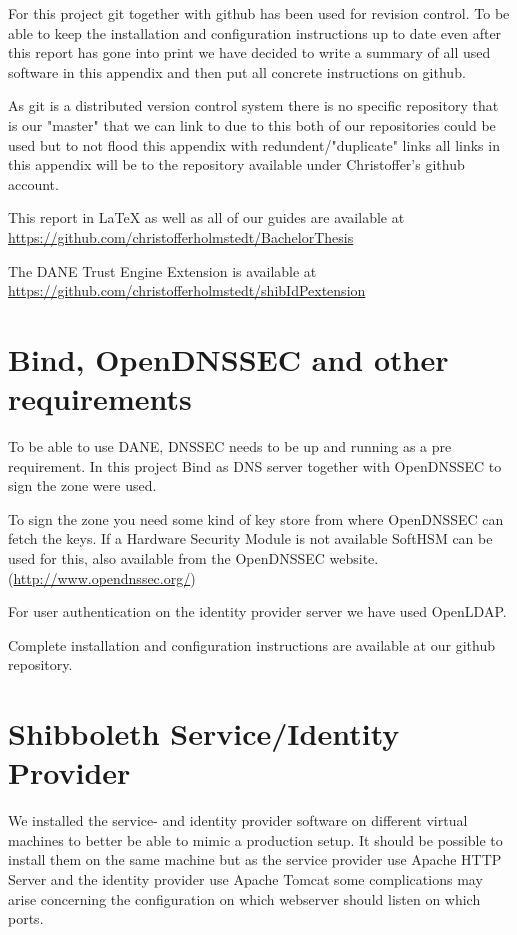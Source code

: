 For this project git together with github has been used for revision control.
To be able to keep the installation and configuration instructions up to date even after this report has gone into print we have decided to write a summary of all used software in this appendix and then put all concrete instructions on github.

As git is a distributed version control system there is no specific repository that is our "master" that we can link to due to this both of our repositories could be used but to not flood this appendix with redundent/"duplicate" links all links in this appendix will be to the repository available under Christoffer's github account.

This report in LaTeX as well as all of our guides are available at \\
\url{https://github.com/christofferholmstedt/BachelorThesis}

The DANE Trust Engine Extension is available at \\
\url{https://github.com/christofferholmstedt/shibIdPextension}

\section{Bind, OpenDNSSEC and other requirements}
To be able to use DANE, DNSSEC needs to be up and running as a pre requirement.
In this project Bind as DNS server together with OpenDNSSEC to sign the zone were used.

To sign the zone you need some kind of key store from where OpenDNSSEC can fetch the keys.
If a Hardware Security Module is not available SoftHSM can be used for this, also available from the OpenDNSSEC website.
(\url{http://www.opendnssec.org/})

For user authentication on the identity provider server we have used OpenLDAP.

Complete installation and configuration instructions are available at our github repository.

\section{Shibboleth Service/Identity Provider}
We installed the service- and identity provider software on different virtual machines to better be able to mimic a production setup.
It should be possible to install them on the same machine but as the service provider use Apache HTTP Server and the identity provider use Apache Tomcat some complications may arise concerning the configuration on which webserver should listen on which ports.

